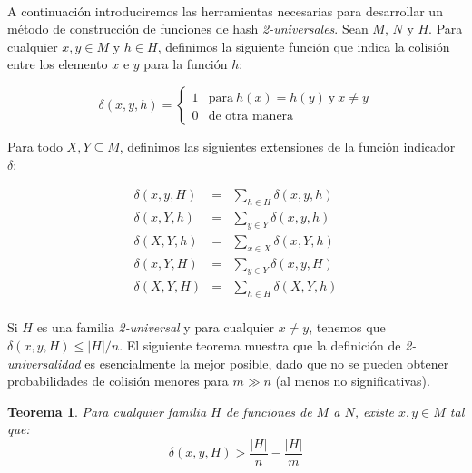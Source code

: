 \documentclass[a4paper,12pt, oneside]{article}
\newtheorem{theorem}{Teorema}[section]
\begin{document}
\

A continuación introduciremos las herramientas necesarias para desarrollar un método de construcción de funciones de hash \textit{2-universales}. Sean $M$, $N$ y $H$. Para cualquier $x,y \in M$ y $h \in H$, definimos la siguiente función que indica la colisión entre los elemento $x$ e $y$ para la función $h$:

\begin{equation}
	\delta(x,y,h) = \left\{
								\begin{array}{ll}

									1 & \text{para} \ h(x) = h(y) \ \text{y} \ x \neq y \\
									0 & \text{de otra manera}
								\end{array}
							\right.
\end{equation}

Para todo $X, Y \subseteq M$, definimos las siguientes extensiones de la función indicador $\delta$:

\begin{equation}
	\begin{array}{lll}
		\delta(x,y,H) & = & \sum\limits_{h \in H} \delta(x,y,h) \\[0.5cm]
		\delta(x,Y,h) & = & \sum\limits_{y \in Y} \delta(x,y,h) \\[0.5cm]
		\delta(X,Y,h) & = & \sum\limits_{x \in X} \delta(x,Y,h) \\[0.5cm]
		\delta(x,Y,H) & = & \sum\limits_{y \in Y} \delta(x,y,H) \\[0.5cm]
		\delta(X,Y,H) & = & \sum\limits_{h \in H} \delta(X,Y,h) \\
	\end{array}
\end{equation}

Si $H$ es una familia \textit{2-universal} y para cualquier $x \neq y$, tenemos que $\delta(x,y,H) \leq |H|/n$.
El siguiente teorema muestra que la definición de \textit{2-universalidad} es esencialmente la mejor posible, dado que no se pueden obtener probabilidades de colisión menores para $m \gg n$ (al menos no significativas).

\begin{theorem}

	Para cualquier familia $H$ de funciones de $M$ a $N$, existe $x, y \in M$ tal que:
	\begin{equation}
		\delta(x,y,H) > \frac{|H|}{n} - \frac{|H|}{m}
	\end{equation}
\end{theorem}
\end{document}
